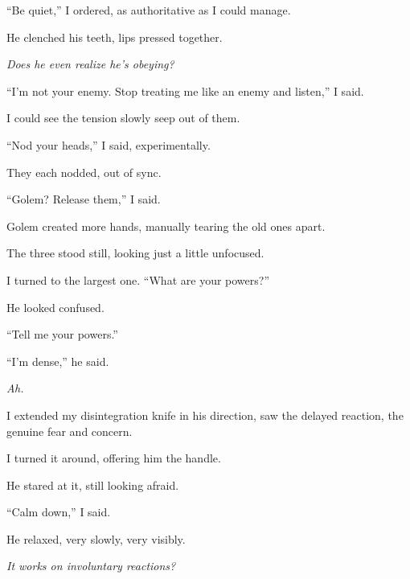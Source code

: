 ``Be quiet,'' I ordered, as authoritative as I could manage.



He clenched his teeth, lips pressed together.



\emph{Does he even realize he's obeying?}



``I'm not your enemy.  Stop treating me like an enemy and listen,'' I said.



I could see the tension slowly seep out of them.



``Nod your heads,'' I said, experimentally.



They each nodded, out of sync.



``Golem?  Release them,'' I said.



Golem created more hands, manually tearing the old ones apart.



The three stood still, looking just a little unfocused.



I turned to the largest one.  ``What are your powers?''



He looked confused.



``Tell me your powers.''



``I'm dense,'' he said.



\emph{Ah.}



I extended my disintegration knife in his direction, saw the delayed reaction, the genuine fear and concern.



I turned it around, offering him the handle.



He stared at it, still looking afraid.



``Calm down,'' I said.



He relaxed, very slowly, very visibly.



\emph{It works on involuntary reactions?}



